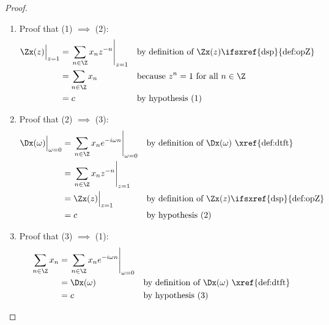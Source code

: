 \begin{proof}
\begin{enumerate}
  \item Proof that (1) $\implies$ (2):
    \begin{align*}
      \Zx(z)\Big|_{z=1}
        &= \left.\sum_{n\in\Z} x_n z^{-n} \right|_{z=1}
        && \text{by definition of $\Zx(z)$\ifsxref{dsp}{def:opZ}}
      \\&= \sum_{n\in\Z} x_n
        && \text{because $z^n=1$ for all $n\in\Z$}
      \\&= c
        && \text{by hypothesis (1)}
    \end{align*}


  \item Proof that (2) $\implies$ (3):
    \begin{align*}
      \Dx(\omega)\Big|_{\omega=0}
        &= \left.\sum_{n\in\Z} x_n e^{-i\omega n} \right|_{\omega=0}
        && \text{by definition of $\Dx(\omega)$ \xref{def:dtft}}
      \\&= \left.\sum_{n\in\Z} x_n z^{-n} \right|_{z=1}
      \\&= \Zx(z)\Big|_{z=1}
        && \text{by definition of $\Zx(z)$\ifsxref{dsp}{def:opZ}}
      \\&= c
        && \text{by hypothesis (2)}
    \end{align*}

  \item Proof that (3) $\implies$ (1):
    \begin{align*}
      \sum_{n\in\Z} x_n
        &= \left.\sum_{n\in\Z} x_n e^{-i\omega n} \right|_{\omega=0}
      \\&= \Dx(\omega)
        && \text{by definition of $\Dx(\omega)$ \xref{def:dtft}}
      \\&= c
        && \text{by hypothesis (3)}
    \end{align*}
\end{enumerate}
\end{proof}



